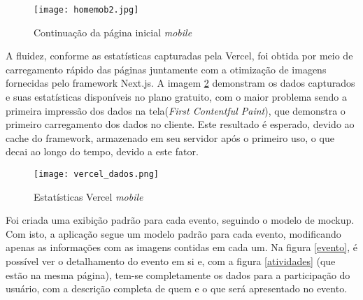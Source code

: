 \begin{figure}[H]
    \caption{\label{homemob2}Continuação da página inicial \textit{mobile}}
    \vspace{5pt}
    \centering
    \texttt{[image: homemob2.jpg]}
    \vspace{5pt}
\end{figure}

A fluidez, conforme as estatísticas capturadas pela Vercel, foi obtida por meio de carregamento rápido das páginas juntamente com a otimização de imagens fornecidas pelo framework Next.js. A imagem \ref{estVercel} demonstram os dados capturados e suas estatísticas disponíveis no plano gratuito, com o maior problema sendo a primeira impressão dos dados na tela(\textit{First Contentful Paint}), que demonstra o primeiro carregamento dos dados no cliente. Este resultado é esperado, devido ao cache do framework, armazenado em seu servidor após o primeiro uso, o que decai ao longo do tempo, devido a este fator.

\begin{figure}[H]
    \caption{\label{estVercel}Estatísticas Vercel \textit{mobile}}
    \vspace{5pt}
    \centering
    \texttt{[image: vercel\_dados.png]}
    \vspace{5pt}
\end{figure}

Foi criada uma exibição padrão para cada evento, seguindo o modelo de mockup. Com isto, a aplicação segue um modelo padrão para cada evento, modificando apenas as informações com as imagens contidas em cada um. Na figura \ref{evento}, é possível ver o detalhamento do evento em si e, com a figura \ref{atividades} (que estão na mesma página), tem-se completamente os dados para a participação do usuário, com a descrição completa de quem e o que será apresentado no evento. 


